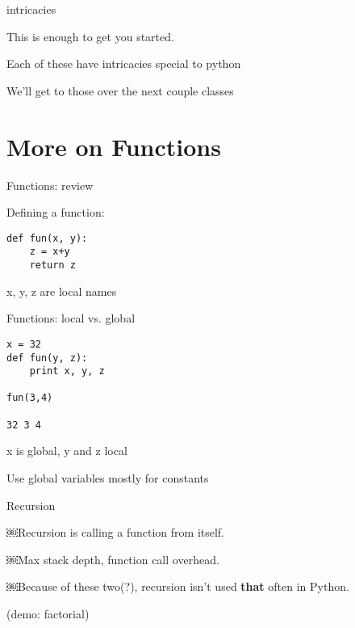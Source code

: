 \documentclass{beamer}
\begin{document}
\begin{frame}[fragile]{intricacies}

\vfill
{\Large This is enough to get you started.}

\vfill
{\Large Each of these have intricacies special to python}

\vfill
{\Large We'll get to those over the next couple classes}

\vfill

\end{frame}

\section{More on Functions}

\begin{frame}[fragile]{Functions: review}

{\Large Defining a function:}

\begin{verbatim}
def fun(x, y):
    z = x+y
    return z
\end{verbatim}

{\Large x, y, z are local names}

\end{frame}


\begin{frame}[fragile]{Functions: local vs. global}

\begin{verbatim}
x = 32
def fun(y, z):
    print x, y, z

fun(3,4)

32 3 4
\end{verbatim}
{\large x is global, y and z local}

\vfill
{\Large Use global variables mostly for constants}

\end{frame}


\begin{frame}[fragile]{Recursion}

\vfill
{\Large￼Recursion is calling a function from itself.}

\vfill
{\Large￼Max stack depth, function call overhead.}

\vfill
{\Large￼Because of these two(?), recursion isn't used {\bf that} often in Python.}

\vfill
(demo: factorial)
\end{frame}
\end{document}
